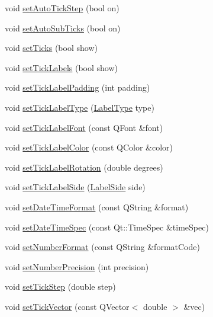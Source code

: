 \begin{DoxyCompactItemize}
\item 
void \hyperlink{class_q_c_p_axis_a99fe77b034e06f5b723995beab96e741}{set\+Auto\+Tick\+Step} (bool on)
\item 
void \hyperlink{class_q_c_p_axis_adcbdec7a60054b88571e89599f4a45bf}{set\+Auto\+Sub\+Ticks} (bool on)
\item 
void \hyperlink{class_q_c_p_axis_ac891409315bc379e3b1abdb162c1a011}{set\+Ticks} (bool show)
\item 
void \hyperlink{class_q_c_p_axis_a04ba16e1f6f78d70f938519576ed32c8}{set\+Tick\+Labels} (bool show)
\item 
void \hyperlink{class_q_c_p_axis_af302c479af9dbc2e9f0e44e07c0012ee}{set\+Tick\+Label\+Padding} (int padding)
\item 
void \hyperlink{class_q_c_p_axis_a54f24f5ce8feea25209388a863d7e448}{set\+Tick\+Label\+Type} (\hyperlink{class_q_c_p_axis_a4a7da0166f755f5abac23b765d184cad}{Label\+Type} type)
\item 
void \hyperlink{class_q_c_p_axis_a2b8690c4e8dbc39d9185d2b398ce7a6c}{set\+Tick\+Label\+Font} (const Q\+Font \&font)
\item 
void \hyperlink{class_q_c_p_axis_a395e445c3fe496b935bee7b911ecfd1c}{set\+Tick\+Label\+Color} (const Q\+Color \&color)
\item 
void \hyperlink{class_q_c_p_axis_a1bddd4413df8a576b7ad4b067fb33375}{set\+Tick\+Label\+Rotation} (double degrees)
\item 
void \hyperlink{class_q_c_p_axis_a13ec644fc6e22715744c92c6dfa4f0fa}{set\+Tick\+Label\+Side} (\hyperlink{class_q_c_p_axis_a24b13374b9b8f75f47eed2ea78c37db9}{Label\+Side} side)
\item 
void \hyperlink{class_q_c_p_axis_a2ee0191daa03524a682113e63e05f7a7}{set\+Date\+Time\+Format} (const Q\+String \&format)
\item 
void \hyperlink{class_q_c_p_axis_a262e06731debed7eee11fa6a81d67eaf}{set\+Date\+Time\+Spec} (const Qt\+::\+Time\+Spec \&time\+Spec)
\item 
void \hyperlink{class_q_c_p_axis_ae585a54dc2aac662e90a2ca82f002590}{set\+Number\+Format} (const Q\+String \&format\+Code)
\item 
void \hyperlink{class_q_c_p_axis_a21dc8023ad7500382ad9574b48137e63}{set\+Number\+Precision} (int precision)
\item 
void \hyperlink{class_q_c_p_axis_af727db0acc6492c4c774c0700e738205}{set\+Tick\+Step} (double step)
\item 
void \hyperlink{class_q_c_p_axis_a871db94c5d796c80fcbe1a9d4506e27e}{set\+Tick\+Vector} (const Q\+Vector$<$ double $>$ \&vec)

\end{DoxyCompactItemize}
